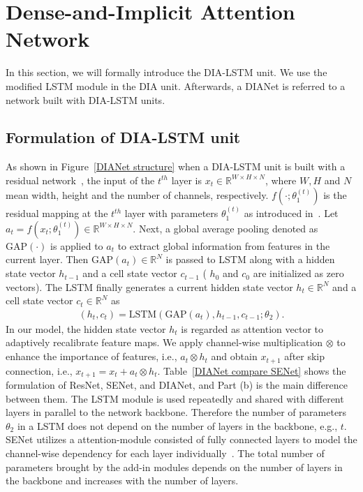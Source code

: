 \documentclass[letterpaper]{article} \usepackage{aaai20}  \usepackage{times}  \usepackage{helvet} \usepackage{courier}  \usepackage[hyphens]{url}  \usepackage{graphicx} \urlstyle{rm} \def\UrlFont{\rm}  \usepackage{graphicx}  \frenchspacing  \setlength{\pdfpagewidth}{8.5in}  \setlength{\pdfpageheight}{11in}  \usepackage{color}
\begin{document}
	\section{Dense-and-Implicit Attention Network}
	\label{DIA}
	In this section, we will formally introduce the DIA-LSTM unit. We use the modified LSTM module in the DIA unit. Afterwards, a DIANet is referred to a network built with DIA-LSTM units. 
	\subsection{Formulation of DIA-LSTM unit}\label{subsec:Formulation of DIANet}
    As shown in Figure~\ref{DIANet structure} when a DIA-LSTM unit is built with a residual network~\cite{he2016deep}, the input of the $t^{th}$ layer is $x_t\in \mathbb{R}^{W\times H \times N}$, where $W, H$ and $N$ mean width, height and the number of channels, respectively. $f(\cdot; \theta_1^{(t)})$ is the residual mapping  at the $t^{th}$ layer with parameters $\theta_1^{(t)}$ as introduced in~\cite{he2016deep}. Let $a_t = f(x_t; \theta_1^{(t)})\in\mathbb{R}^{W\times H \times N}.$ Next, a global average pooling denoted as $\text{GAP}(\cdot)$ is applied to $a_t$ to extract global information from features in the current layer. Then $\text{GAP}(a_t)\in \mathbb{R}^{ N}$ is passed to LSTM along with a hidden state vector $h_{t-1}$ and a cell state vector $c_{t-1}$ ( $h_0$ and $c_0$ are initialized as zero vectors). The LSTM finally generates a current hidden state vector $h_{t}\in \mathbb{R}^{N}$ and a cell state vector $c_{t}\in \mathbb{R}^{N}$ as
	\begin{align}
	(h_t,c_t) = \text{LSTM}(\text{GAP}(a_t), h_{t-1},c_{t-1};\theta_{2}).
	\label{eqn:lstm-dia}
	\end{align}
	 In our model, the hidden state vector $h_t$ is regarded as attention vector to adaptively recalibrate feature maps. We apply channel-wise multiplication $\otimes$ to enhance the importance of features, i.e., $a_t \otimes h_t$ and obtain $x_{t+1}$ after skip connection, i.e., $x_{t+1} = x_t + a_t \otimes h_t$. Table~\ref{DIANet compare SENet} shows the formulation of ResNet, SENet, and DIANet, and Part (b) is the main difference between them. The LSTM module is used repeatedly and shared with different layers in parallel to the network backbone. Therefore the number of parameters $\theta_{2}$ in a LSTM does not depend on the number of layers in the backbone, e.g., $t$. SENet utilizes a attention-module consisted of fully connected layers to model the channel-wise dependency for each layer individually~\cite{hu2018squeeze}. The total number of parameters brought by the add-in modules depends on the number of layers in the backbone and increases with the number of layers. 
\end{document}
